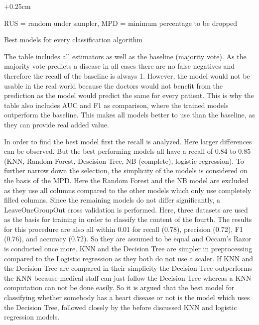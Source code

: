 \begin{table}[h]
\begin{adjustwidth}{-0.25cm}{}
\begin{footnotesize}
		 \begin{adjustwidth}{+0.25cm}{}
		\begin{center}
			\centering
			RUS = random under sampler, MPD = minimum percentage to be dropped
		\end{center}
		\end{adjustwidth}
	\end{footnotesize}
	\caption{Best models for every classification algorithm}
	\label{table:modelresults}

	 \end{adjustwidth}
\end{table}

The table includes all estimators as well as the baseline (majority vote). 
As the majority vote predicts a disease in all cases there are no false negatives and therefore the recall of the baseline is always 1. However, the model would not be usable in the real world because the doctors would not benefit from the prediction as the model would predict the same for every patient. This is why the table also includes AUC and F1 as comparison, where the trained models outperform the baseline. This makes all models better to use than the baseline, as they can provide real added value. 

In order to find the best model first the recall is analyzed. Here larger differences can be observed. But the best performing models all have a recall of 0.84 to 0.85 (KNN, Random Forest, Descision Tree, NB (complete), logistic regression).  To further narrow down the selection, the simplicity of the models is considered on the basis of the MPD. Here the Random Forest and the NB model are excluded as they use all columns compared to the other models which only use completely filled columns. Since the remaining models do not differ significantly, a LeaveOneGroupOut cross validation is performed. Here, three datasets are used as the basis for training in order to classify the content of the fourth. The results for this procedure are also all within 0.01 for recall (0.78), precision (0.72), F1 (0.76), and accuracy (0.72). So they are assumed to be equal and Occam's Razor is conducted once more. KNN and the Decision Tree are simpler in preprocessing compared to the Logistic regression as they both do not use a scaler. If KNN and the Decision Tree are compared in their simplicity the Decision Tree outperforms the KNN because medical staff can just follow the Decision Tree whereas a KNN computation can not be done easily. 
So it is argued that the best model for classifying whether somebody has a heart disease or not is the model which uses the Decision Tree, followed closely by the before discussed KNN and logistic regression models.


